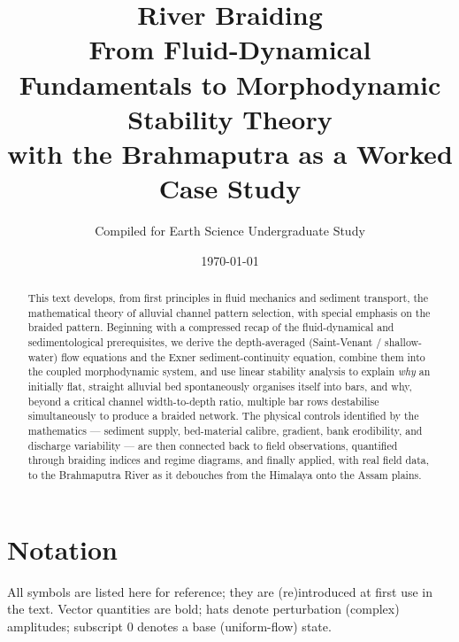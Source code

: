 \documentclass[11pt,a4paper]{report}
\title{\Huge\textbf{River Braiding}\\[6pt]\Large From Fluid-Dynamical Fundamentals to Morphodynamic Stability Theory\\[4pt]\large with the Brahmaputra as a Worked Case Study}
\author{Compiled for Earth Science Undergraduate Study}
\date{\today}
\theoremstyle{definition}
\theoremstyle{plain}
\theoremstyle{remark}
\begin{document}
\maketitle
\thispagestyle{empty}

\begin{abstract}
\noindent This text develops, from first principles in fluid mechanics and sediment transport, the mathematical theory of alluvial channel pattern selection, with special emphasis on the braided pattern. Beginning with a compressed recap of the fluid-dynamical and sedimentological prerequisites, we derive the depth-averaged (Saint-Venant / shallow-water) flow equations and the Exner sediment-continuity equation, combine them into the coupled morphodynamic system, and use linear stability analysis to explain \emph{why} an initially flat, straight alluvial bed spontaneously organises itself into bars, and why, beyond a critical channel width-to-depth ratio, multiple bar rows destabilise simultaneously to produce a braided network. The physical controls identified by the mathematics --- sediment supply, bed-material calibre, gradient, bank erodibility, and discharge variability --- are then connected back to field observations, quantified through braiding indices and regime diagrams, and finally applied, with real field data, to the Brahmaputra River as it debouches from the Himalaya onto the Assam plains.
\end{abstract}
\tableofcontents

\chapter*{Notation}
All symbols are listed here for reference; they are (re)introduced at first use in the text. Vector quantities are bold; hats denote perturbation (complex) amplitudes; subscript $0$ denotes a base (uniform-flow) state.
\end{document}
